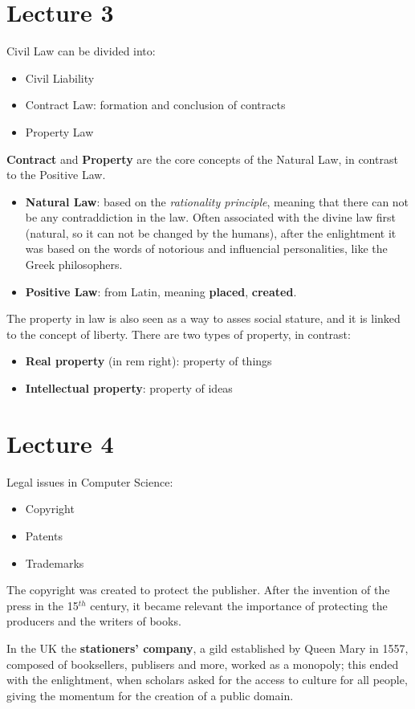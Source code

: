 \documentclass[a4paper, 10pt, titlepage]{article}
\begin{document}
\section{Lecture 3}
Civil Law can be divided into:
\begin{itemize}
\item Civil Liability
\item Contract Law: formation and conclusion of contracts
\item Property Law
\end{itemize}
\textbf{Contract} and \textbf{Property} are the core concepts of the Natural Law, in contrast to the Positive Law.
\begin{itemize}
\item \textbf{Natural Law}: based on the \textit{rationality principle}, meaning that there can not be any contraddiction in the law. Often associated with the divine law first (natural, so it can not be changed by the humans), after the enlightment it was based on the words of notorious and influencial personalities, like the Greek philosophers.
\item \textbf{Positive Law}: from Latin, meaning \textbf{placed}, \textbf{created}.
\end{itemize}
The property in law is also seen as a way to asses social stature, and it is linked to the concept of liberty.
There are two types of property, in contrast:
\begin{itemize}
\item \textbf{Real property} (in rem right): property of things
\item \textbf{Intellectual property}: property of ideas
\end{itemize}

\section{Lecture 4}
Legal issues in Computer Science:
\begin{itemize}
\item Copyright
\item Patents
\item Trademarks
\end{itemize}
The copyright was created to protect the publisher. After the invention of the press in the 15$^{th}$ century, it became relevant the importance of protecting the producers and the writers of books.

In the UK the \textbf{stationers' company}, a gild established by Queen Mary in 1557, composed of booksellers, publisers and more, worked as a monopoly; this ended with the enlightment, when scholars asked for the access to culture for all people, giving the momentum for the creation of a public domain. 
\end{document}
